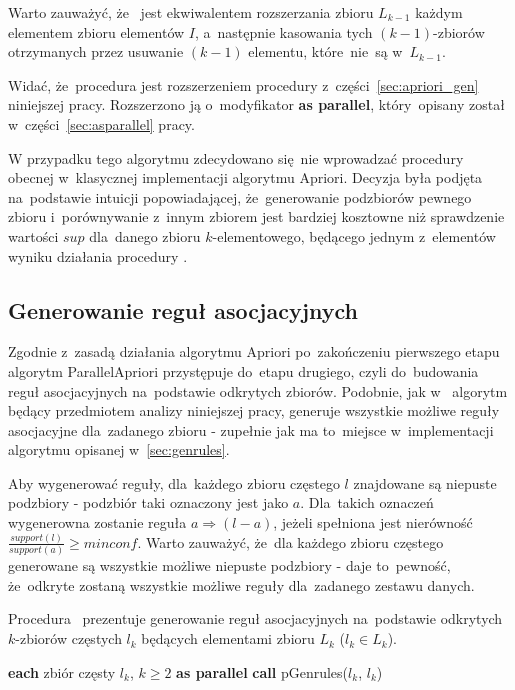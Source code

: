 Warto zauważyć, że~ jest ekwiwalentem rozszerzania zbioru $L_{k-1}$ każdym elementem zbioru elementów $I$, a~następnie kasowania tych $(k-1)$-zbiorów otrzymanych przez usuwanie $(k-1)$ elementu, które~nie~są w~$L_{k-1}$. 

Widać, że~procedura  jest rozszerzeniem procedury  z~części~\ref{sec:apriori_gen} niniejszej pracy. Rozszerzono ją o~modyfikator \textbf{as parallel}, który~opisany został w~części~\ref{sec:asparallel} pracy.

W przypadku tego algorytmu zdecydowano się~nie wprowadzać procedury  obecnej w~klasycznej implementacji algorytmu Apriori. Decyzja była podjęta na~podstawie intuicji popowiadającej, że~generowanie podzbiorów pewnego zbioru i~porównywanie z~innym zbiorem jest bardziej kosztowne niż sprawdzenie wartości $sup$ dla~danego zbioru $k$-elementowego, będącego jednym z~elementów wyniku działania procedury .

\subsection{Generowanie reguł asocjacyjnych}
Zgodnie z~zasadą działania algorytmu Apriori po~zakończeniu pierwszego etapu algorytm ParallelApriori przystępuje do~etapu drugiego, czyli do~budowania reguł asocjacyjnych na~podstawie odkrytych zbiorów. Podobnie, jak w~\cite{Apriori:Main} algorytm będący przedmiotem analizy niniejszej pracy, generuje wszystkie możliwe reguły asocjacyjne dla~zadanego zbioru - zupełnie jak ma to~miejsce w~implementacji algorytmu opisanej w~\ref{sec:genrules}.

Aby wygenerować reguły, dla~każdego zbioru częstego $l$ znajdowane są niepuste podzbiory - podzbiór taki oznaczony jest jako $a$. Dla~takich oznaczeń wygenerowna zostanie reguła $a \Rightarrow (l-a)$, jeżeli spełniona jest nierówność $\frac{support(l)}{support(a)} \geq minconf$. Warto zauważyć, że~dla każdego zbioru częstego generowane są wszystkie możliwe niepuste podzbiory - daje to~pewność, że~odkryte zostaną wszystkie możliwe reguły dla~zadanego zestawu danych.

Procedura~ prezentuje generowanie reguł asocjacyjnych na~podstawie odkrytych $k$-zbiorów częstych $l_k$ będących elementami zbioru $L_k$ ($l_k \in L_k$).

\begin{codebox}
		\li \For \textbf{each} zbiór częsty $l_k$, $k \geq 2$  \textbf{as parallel}
		\li \Do
			\textbf{call} pGenrules($l_k$, $l_k$)
			\End
		\End
\end{codebox}

